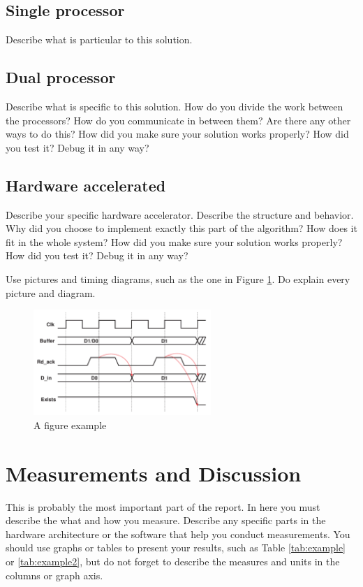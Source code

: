 \documentclass[11pt]{article}
\begin{document}
\subsection{Single processor}
Describe what is particular to this solution.
\subsection{Dual processor}
Describe what is specific to this solution. How do you divide the work between the processors? How do you communicate in between them? Are there any other ways to do this? How did you make sure your solution works properly? How did you test it? Debug it in any way?
\subsection{Hardware accelerated}
Describe your specific hardware accelerator. Describe the structure and behavior. Why did you choose to implement exactly this part of the algorithm? How does it fit in the whole system? How did you make sure your solution works properly? How did you test it? Debug it in any way?

Use pictures and timing diagrams, such as the one in Figure \ref{fig:example}. Do explain every picture and diagram.

\begin{figure}[!htb]
   \centering
   \includegraphics[width=0.6\textwidth]{example} 
   \caption{A figure example}
   \label{fig:example}
\end{figure}

\section{Measurements and Discussion}
This is probably the most important part of the report. In here you must describe the what and how you measure. Describe any specific parts in the hardware architecture or the software that help you conduct measurements. You should use graphs or tables to present your results, such as Table \ref{tab:example} or \ref{tab:example2}, but do not forget to describe the measures and units in the columns or graph axis.
\end{document}
